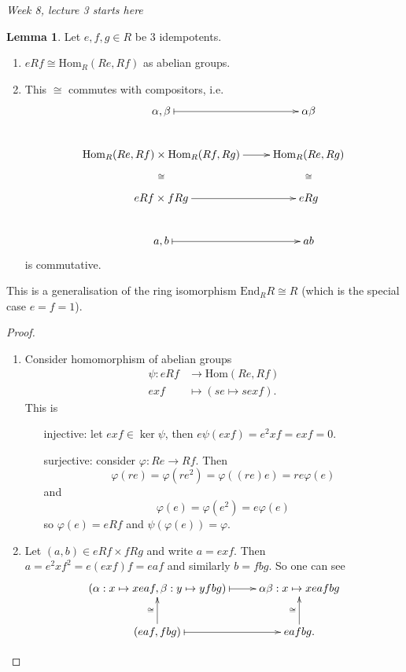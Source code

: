 \documentclass[a4paper]{article}
\newcommand{\End}{\text{End}}
\newcommand{\Hom}{\text{Hom}}
\theoremstyle{definition}
\newtheorem{lemma}[defn]{Lemma}
\begin{document}
\begin{flushright}
\textit{Week 8, lecture 3 starts here}
\end{flushright}

\begin{lemma}
\label{lemma:eRfisoHomReRf}
Let $e,f,g\in R$ be 3 idempotents.
\begin{enumerate}
\item $eRf\cong\Hom_R(Re,Rf)$ as abelian groups.
\item This $\cong$ commutes with compositors, i.e.
\[
\xymatrix{
  \alpha, \beta\ar@{|->}[r] &\alpha\beta \\
  \Hom_R(Re,Rf)\times \Hom_R(Rf,Rg) \ar[r] \ar@{}[d]|{\cong} & \Hom_R(Re,Rg)\ar@{}[d]|{\cong} \\
  eRf\times fRg\ar[r] & eRg \\
  a,b\ar@{|->}[r] & ab
}
\]
is commutative.
\end{enumerate}
\end{lemma}
This is a generalisation of the ring isomorphism $\End_RR\cong R$ (which is the special case $e=f=1$).
\begin{proof}
\begin{enumerate}
\item Consider homomorphism of abelian groups
\[
\begin{aligned}
\psi:eRf&\rightarrow \Hom(Re,Rf)\\
exf&\mapsto (se\mapsto sexf).
\end{aligned}
\]
This is
\begin{itemize}
\item[injective:] let $exf\in\ker\psi$, then $e\psi(exf)=e^2xf=exf=0$.
\item[surjective:] consider $\varphi:Re\rightarrow Rf$. Then
\[
\varphi(re)=\varphi(re^2)=\varphi((re)e)=re\varphi(e)
\]
and
\[
\varphi(e)=\varphi(e^2)=e\varphi(e)
\]
so $\varphi(e)=eRf$ and $\psi(\varphi(e))=\varphi$.
\end{itemize}
\item Let $(a,b)\in eRf\times fRg$ and write $a=exf$. Then $a=e^2xf^2=e(exf)f=eaf$ and similarly $b=fbg$. So one can see
\[
\xymatrix{
  (\alpha:x\mapsto xeaf,\beta:y\mapsto yfbg)\ar@{|->}[r] & \alpha\beta:x\mapsto xeafbg \\
  (eaf,fbg)\ar@{|->}[r]\ar[u]^\cong & eafbg.\ar[u]^\cong
}
\]
\end{enumerate} 
\end{proof}
\end{document}

